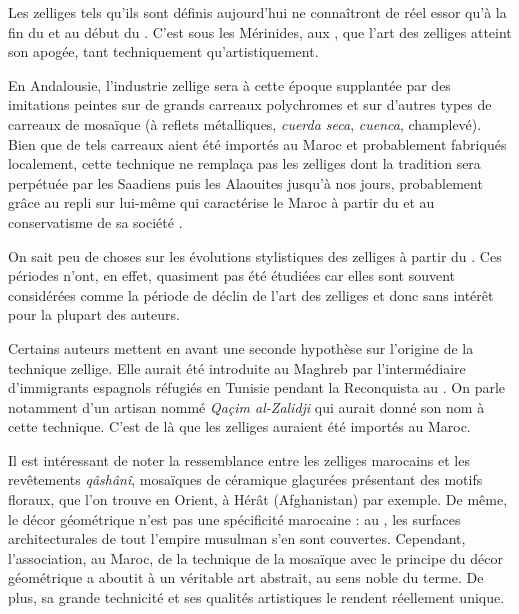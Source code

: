Les zelliges tels qu'ils sont définis aujourd'hui  ne connaîtront de réel essor qu'à la fin du 
 et au début du . C'est sous les Mérinides, 
aux , que l'art des zelliges atteint son apogée, 
tant techniquement qu'artistiquement.

En Andalousie, l'industrie zellige sera à cette époque supplantée 
par des imitations peintes sur de grands carreaux polychromes et 
sur d'autres types de carreaux de mosaïque (à reflets métalliques, 
\emph{cuerda seca}, \emph{cuenca}, champlevé). Bien que de tels 
carreaux aient été importés au Maroc et probablement fabriqués 
localement, cette technique ne remplaça pas les zelliges dont la 
tradition sera perpétuée par les Saadiens puis les Alaouites jusqu'à 
nos jours, probablement grâce au repli sur lui-même qui caractérise 
le Maroc à partir du  et au conservatisme de sa société 
\autocite{Damluji_1993a}.

On sait peu de choses sur les évolutions stylistiques des zelliges à 
partir du . Ces périodes n'ont, en effet, quasiment pas été 
étudiées car elles sont souvent considérées comme la période de déclin 
de l'art des zelliges et donc sans intérêt pour la plupart des auteurs.

Certains auteurs \autocite{Castera_1996, Soustiel_1985} mettent en 
avant une seconde hypothèse sur l'origine de la technique zellige. 
Elle aurait été introduite au Maghreb par l'intermédiaire d'immigrants 
espagnols réfugiés en Tunisie pendant la Reconquista au . 
On parle notamment d'un artisan nommé \emph{Qaçim al-Zalidji} qui 
aurait donné son nom à cette technique. C'est de là que les zelliges 
auraient été importés au Maroc.

Il est intéressant de noter la ressemblance entre les zelliges 
marocains et les revêtements \emph{qâshânî}, mosaïques de céramique 
glaçurées présentant des motifs floraux, que l'on trouve en Orient, 
à Hérât (Afghanistan) par exemple. De même, le décor géométrique 
n'est pas une spécificité marocaine : au , les surfaces 
architecturales de tout l'empire musulman s'en sont couvertes. 
Cependant, l'association, au Maroc, de la technique de la mosaïque 
avec le principe du décor géométrique a aboutit à un véritable art 
abstrait, au sens noble du terme. De plus, sa grande technicité et 
ses qualités artistiques le rendent réellement unique.

